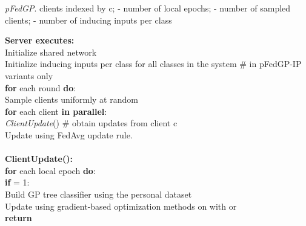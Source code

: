 \documentclass{article}
\begin{document}
\begin{algorithm}[!t] 
    \label{algo:pfedgp}
    \caption{\textit{pFedGP}.  clients indexed by c;  - number of local epochs;  - number of sampled clients;  - number of inducing inputs per class}
	\vspace{0.1cm}
	{\bf Server executes:}\\
	\hspace*{5mm} Initialize shared network \\
	\hspace*{5mm} Initialize  inducing inputs per class for all classes in the system  \textcolor{OliveGreen}{\# in pFedGP-IP variants only}\\
	\hspace*{5mm} \textbf{for} each round  \textbf{do}:\\
	\hspace*{10mm} Sample  clients uniformly at random\\
	\hspace*{10mm} \textbf{for} each client  \textbf{in parallel}:\\
	\hspace*{15mm}  \textit{ClientUpdate}() \textcolor{OliveGreen}{\# obtain updates from client c}\\
	\hspace*{10mm} Update   using FedAvg \cite{mcmahan2017communication} update rule.
	\\~\\
	\textbf{ClientUpdate():}\\
	\hspace*{5mm} \textbf{for} each local epoch  \textbf{do}:\\
	\hspace*{10mm} \textbf{if}  = 1:\\
	\hspace*{15mm} Build GP tree classifier using the personal dataset \\
	\hspace*{10mm} Update  using gradient-based optimization methods on  with  or \\
	\hspace*{5mm} \textbf{return} 
	
\end{algorithm}
\end{document}
